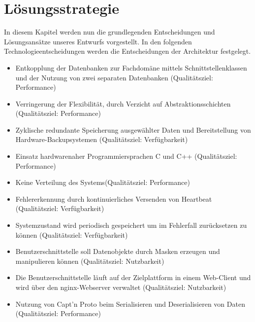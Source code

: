 \chapter{Lösungsstrategie}
\label{ch:Lösungsstrategie}
In diesem Kapitel werden nun die grundlegenden Entscheidungen und Lösungsansätze unseres Entwurfs vorgestellt. In den folgenden Technologieentscheidungen werden die Entscheidungen der Architektur festgelegt.  
\begin{itemize}
	\item Entkopplung der Datenbanken zur Fachdomäne mittels Schnittstellenklassen und der Nutzung von zwei separaten Datenbanken (Qualitätsziel: Performance)
	\item Verringerung der Flexibilität, durch Verzicht auf Abstraktionsschichten (Qualitätsziel: Performance)
	\item Zyklische redundante Speicherung ausgewählter Daten und Bereitstellung von Hardware-Backupsystemen (Qualitätsziel: Verfügbarkeit)
	\item Einsatz hardwarenaher Programmiersprachen C und C++ (Qualitätsziel: Performance)
	\item Keine Verteilung des Systems(Qualitätsziel: Performance)
	\item Fehlererkennung durch kontinuierliches Versenden von Heartbeat (Qualitätsziel: Verfügbarkeit)
	\item Systemzustand wird periodisch gespeichert um im Fehlerfall zurücksetzen zu können (Qualitätsziel: Verfügbarkeit) 
	\item Benutzerschnittstelle soll Datenobjekte durch Masken erzeugen und manipulieren können (Qualitätsziel: Nutzbarkeit) 
	\item Die Benutzerschnittstelle läuft auf der Zielplattform in einem Web-Client und wird über den nginx-Webserver verwaltet (Qualitätsziel: Nutzbarkeit)
	\item Nutzung von Capt'n Proto beim Serialisieren und Deserialisieren von Daten (Qualitätsziel: Performance)
\end{itemize}